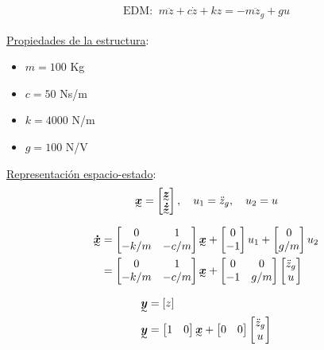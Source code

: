 \begin{align*}
    \text{EDM: }~ m\ddot{z}+c\dot{z}+kz=-m\ddot{z}_g+gu
\end{align*}

\underline{Propiedades de la estructura}: 
\begin{itemize}
    \item $m=100$ Kg
    \item $c=50$ Ns/m
    \item $k=4000$ N/m
    \item $g=100$ N/V
\end{itemize}

\underline{Representación espacio-estado}: 
\begin{align*}
    \tend{x}=\begin{bmatrix}\tend{z}\\ \tend{\dot{z}}\end{bmatrix}, \quad u_1 =\ddot{z}_g, \quad u_2=u
\end{align*}

\begin{align*}
    \tend{\dot{x}} &=
    \begin{bmatrix}
    0 & 1\\
    -k/m & -c/m
    \end{bmatrix}\tend{x} +
    \begin{bmatrix}
    0 \\ -1
    \end{bmatrix}u_1+
    \begin{bmatrix}
    0 \\ g/m
    \end{bmatrix}u_2 \\
    &= \begin{bmatrix} 0 & 1\\-k/m & -c/m
    \end{bmatrix}\tend{x} +
    \begin{bmatrix}
    0 & 0\\ -1 & g/m
    \end{bmatrix} 
    \begin{bmatrix}
    \ddot{z}_g\\ u
    \end{bmatrix}
\end{align*}

\begin{align*}
    \tend{y}&=[z]\\
    \tend{y}&= \begin{bmatrix}1 & 0 \end{bmatrix}\tend{x}+\begin{bmatrix}0 & 0 \end{bmatrix}\begin{bmatrix}
    \ddot{z}_g\\ u
    \end{bmatrix}
\end{align*}

